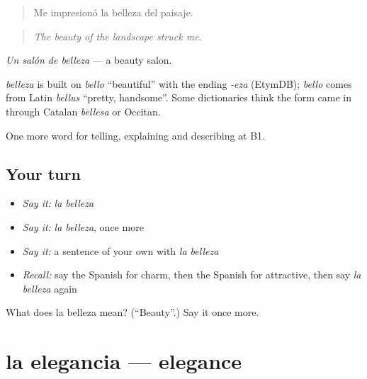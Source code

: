 \begin{quote}
Me impresionó la belleza del paisaje.
\end{quote}

\begin{quote}
\emph{The beauty of the landscape struck me.}
\end{quote}

\emph{Un salón de belleza} — a beauty salon.

\begin{cousinweb}
\emph{belleza} is built on \emph{bello} \textquotedblleft{}beautiful\textquotedblright{} with the ending \emph{-eza} (EtymDB); \emph{bello} comes from Latin \emph{bellus} \textquotedblleft{}pretty, handsome\textquotedblright{}. Some dictionaries think the form came in through Catalan \emph{bellesa} or Occitan.
\end{cousinweb}

\begin{grammarlens}[title={What you've built}]
One more word for telling, explaining and describing at B1.
\end{grammarlens}

\subsection*{Your turn}
\begin{itemize}
\raggedright
  \item \emph{Say it:} \emph{la belleza}
  \item \emph{Say it:} \emph{la belleza}, once more
  \item \emph{Say it:} a sentence of your own with \emph{la belleza}
  \item \emph{Recall:} say the Spanish for charm, then the Spanish for attractive, then say \emph{la belleza} again
\end{itemize}

\begin{tcolorbox}[breakable,colback=teal!4,colframe=teal!35!black,title={Before you move on}]
What does la belleza mean? (\textquotedblleft{}Beauty\textquotedblright{}.) Say it once more.
\end{tcolorbox}
\section[la elegancia]{la elegancia — elegance}

\label{lesson:ES-C730-elegancia}



